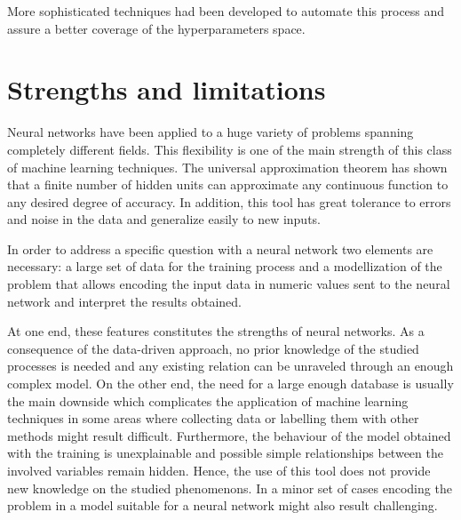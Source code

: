 \documentclass[a4paper,10pt]{report}
\begin{document}
More sophisticated techniques had been developed to automate this process and 
assure a better coverage of the hyperparameters space.

\section{Strengths and limitations}

Neural networks have been applied to a huge variety of problems spanning completely different fields.
This flexibility is one of the main strength of this class of machine learning techniques.
The universal approximation theorem has shown that 
a finite number of hidden units can approximate any continuous function to any desired degree of accuracy.
In addition, this tool has great tolerance to errors and noise in the data and generalize easily to
new inputs.

In order to address a specific question with a neural network two elements are necessary:
a large set of data for the training process and a modellization of the problem that allows
encoding the input data in numeric values sent to the neural network and interpret the results obtained.

At one end, these features constitutes the strengths of neural networks.
As a consequence of the data-driven approach, no prior knowledge of
the studied processes is needed and any existing relation can be unraveled through
an enough complex model.
On the other end, the need for a large enough database is usually the main
downside which complicates the application of machine learning techniques in some areas where
collecting data or labelling them with other methods might result difficult.
Furthermore, the behaviour of the model obtained with the training is unexplainable and 
possible simple relationships between the involved variables remain hidden. 
Hence, the use of this tool does not provide new knowledge on the studied phenomenons.
In a minor set of cases encoding the problem in a model suitable for a neural network might also
result challenging.
\end{document}
